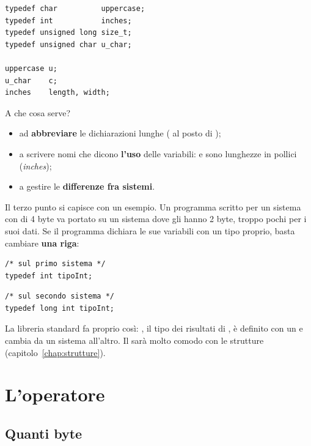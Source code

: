 \begin{affianco}[0.5][c]
\begin{lstlisting}[style=c]
typedef char          uppercase;
typedef int           inches;
typedef unsigned long size_t;
typedef unsigned char u_char;

uppercase u;
u_char    c;
inches    length, width;
\end{lstlisting}
\risultato
A che cosa serve?
\begin{itemize}
  \item ad \textbf{abbreviare} le dichiarazioni lunghe ( al
        posto di );
  \item a scrivere nomi che dicono \textbf{l'uso} delle variabili:
         e  sono lunghezze in pollici
        (\textit{inches});
  \item a gestire le \textbf{differenze fra sistemi}.
\end{itemize}
\end{affianco}

Il terzo punto si capisce con un esempio. Un programma scritto per un sistema
con  di 4 byte va portato su un sistema dove gli  hanno
2 byte, troppo pochi per i suoi dati. Se il programma dichiara le sue
variabili con un tipo proprio, basta cambiare \textbf{una riga}:

\begin{affianco}[0.5][c]
\begin{lstlisting}[style=c]
/* sul primo sistema */
typedef int tipoInt;
\end{lstlisting}
\risultato
\begin{lstlisting}[style=c]
/* sul secondo sistema */
typedef long int tipoInt;
\end{lstlisting}
\end{affianco}

La libreria standard fa proprio così: , il tipo dei risultati di
, è definito con un  e cambia da un sistema
all'altro. Il  sarà molto comodo con le strutture
(capitolo~\ref{chap:strutture}).

\section{L'operatore }

\subsection{Quanti byte}

